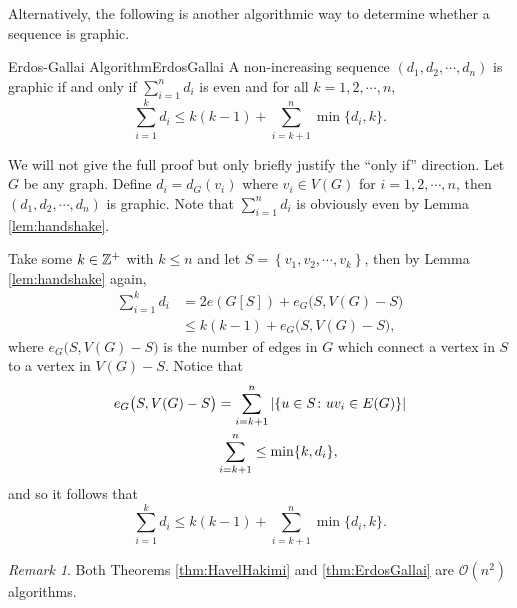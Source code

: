 \documentclass[math, code]{amznotes}
\theoremstyle{remark}
\newtheorem*{remark}{Remark}
\begin{document}
Alternatively, the following is another algorithmic way to determine whether a sequence is graphic.
\begin{thmbox}{Erdos-Gallai Algorithm}{ErdosGallai}
    A non-increasing sequence $(d_1, d_2, \cdots, d_n)$ is graphic if and only if $\sum_{i = 1}^n d_i$ is even and for all $k = 1, 2, \cdots, n$,
    \begin{equation*}
        \sum_{i = 1}^{k} d_i \leq k(k - 1) + \sum_{i = k + 1}^{n}\min\{d_i, k\}.
    \end{equation*}
\end{thmbox}
We will not give the full proof but only briefly justify the ``only if'' direction. Let $G$ be any graph. Define $d_i = d_G(v_i)$ where $v_i \in V(G)$ for $i = 1, 2, \cdots, n$, then $(d_1, d_2, \cdots, d_n)$ is graphic. Note that $\sum_{i = 1}^{n}d_i$ is obviously even by Lemma \ref{lem:handshake}. 

Take some $k \in \mathbb{Z}^+$ with $k \leq n$ and let $S = \left\{v_1, v_2, \cdots, v_k\right\}$, then by Lemma \ref{lem:handshake} again,
\begin{align*}
    \sum_{i = 1}^{k}d_i & = 2e(G[S]) + e_G\bigl(S, V(G) - S\bigr) \\
    & \leq k(k - 1) + e_G\bigl(S, V(G) - S\bigr),
\end{align*}
where $e_G\bigl(S, V(G) - S\bigr)$ is the number of edges in $G$ which connect a vertex in $S$ to a vertex in $V(G) - S$. Notice that
\begin{align*}
    e_G\bigl(S, V(G) - S\bigr) & = \sum_{i = k + 1}^n{\left\lvert {\left\{u \in S \colon uv_i \in E(G)\right\}} \right\rvert} \\
    & \sum_{i = k + 1}^n\leq \min\{k, d_i\},
\end{align*}
and so it follows that
\begin{equation*}
    \sum_{i = 1}^{k} d_i \leq k(k - 1) + \sum_{i = k + 1}^{n}\min\{d_i, k\}.
\end{equation*}
\begin{notebox}
    \begin{remark}
        Both Theorems \ref{thm:HavelHakimi} and \ref{thm:ErdosGallai} are $\mathcal{O}(n^2)$ algorithms.
    \end{remark}
\end{notebox}
\end{document}
